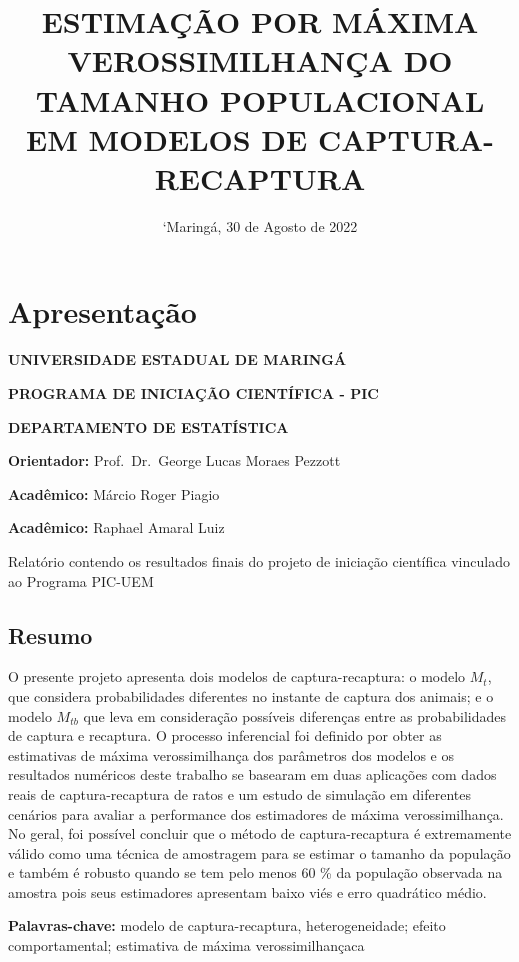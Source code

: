\documentclass[
]{book}
\title{ESTIMAÇÃO POR MÁXIMA VEROSSIMILHANÇA DO TAMANHO POPULACIONAL EM MODELOS DE CAPTURA-RECAPTURA}
\author{}
\date{\vspace{-2.5em}`Maringá, 30 de Agosto de 2022}
\begin{document}
\maketitle

{
\setcounter{tocdepth}{1}
\tableofcontents
}
\hypertarget{apresentauxe7uxe3o}{%
\chapter{Apresentação}\label{apresentauxe7uxe3o}}

\textbf{UNIVERSIDADE ESTADUAL DE MARINGÁ}

\textbf{PROGRAMA DE INICIAÇÃO CIENTÍFICA - PIC}

\textbf{DEPARTAMENTO DE ESTATÍSTICA}

\textbf{Orientador:} Prof.~Dr.~George Lucas Moraes Pezzott

\textbf{Acadêmico:} Márcio Roger Piagio

\textbf{Acadêmico:} Raphael Amaral Luiz

Relatório contendo os resultados finais do projeto de iniciação científica vinculado ao Programa PIC-UEM

\hypertarget{resumo}{%
\section{Resumo}\label{resumo}}

O presente projeto apresenta dois modelos de captura-recaptura: o modelo \(M_t\), que considera probabilidades diferentes no instante de captura dos animais; e o modelo \(M_{tb}\) que leva em consideração possíveis diferenças entre as probabilidades de captura e recaptura. O processo inferencial foi definido por obter as estimativas de máxima verossimilhança dos parâmetros dos modelos e os resultados numéricos deste trabalho se basearam em duas aplicações com dados reais de captura-recaptura de ratos e um estudo de simulação em diferentes cenários para avaliar a performance dos estimadores de máxima verossimilhança. No geral, foi possível concluir que o método de captura-recaptura é extremamente válido como uma técnica de amostragem para se estimar o tamanho da população e também é robusto quando se tem pelo menos 60 \% da população observada na amostra pois seus estimadores apresentam baixo viés e erro quadrático médio.

\textbf{Palavras-chave:} modelo de captura-recaptura, heterogeneidade; efeito comportamental; estimativa de máxima verossimilhançaca
\end{document}
